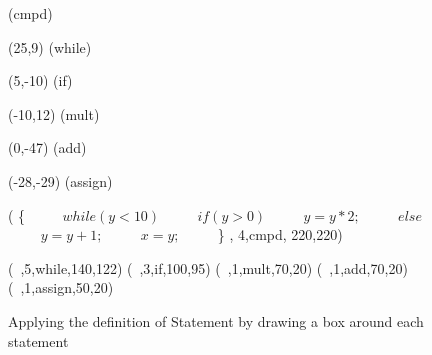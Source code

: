 




\begin {figure}

\Draw

\MarkLoc(cmpd)

\Move(25,9)
\MarkLoc(while)

\Move(5,-10)
\MarkLoc(if)

\Move(-10,12)
\MarkLoc(mult)

\Move(0,-47)
\MarkLoc(add)

\Move(-28,-29)
\MarkLoc(assign)



\boxIt (
	\{  \hfill				~~~~
	\hspace{10pt} $while ( y < 10 )$  \hfill	~~~~
       	\hspace{20pt} $if (y > 0)$ \hfill 	~~~~
       	\hspace{30pt} $y = y * 2;$ \hfill	~~~~
	\hspace{20pt} $else$	   \hfill	~~~~
       	\hspace{30pt} $y = y + 1;$ \hfill	~~~~
       	\hspace{10pt} $x = y;$     \hfill	~~~~
	\}  \hfill,
         4,cmpd, 220,220)

\boxIt (~,5,while,140,122)
\boxIt (~,3,if,100,95)
\boxIt (~,1,mult,70,20)
\boxIt (~,1,add,70,20)
\boxIt (~,1,assign,50,20)

\EndDraw


\caption {Applying the definition of 
 Statement by drawing a box around each statement} 	

 \label {fig:loopsBoxed}

\end {figure}


